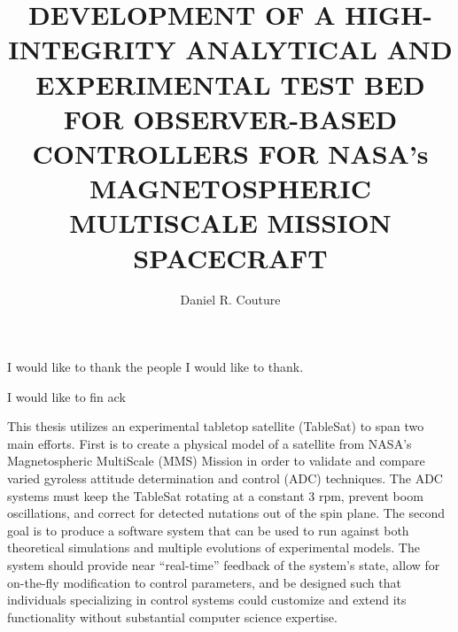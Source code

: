 \documentclass[11pt,doublespace]{unhthesis}
\begin{document}
\title{DEVELOPMENT OF A HIGH-INTEGRITY ANALYTICAL AND EXPERIMENTAL TEST BED FOR OBSERVER-BASED CONTROLLERS FOR NASA's MAGNETOSPHERIC MULTISCALE MISSION SPACECRAFT}
\author{Daniel R. Couture}
\maketitle

\makecopyright

\makeapproval

\begin{dedication}
    I would like to thank the people I would like to thank.
\end{dedication}

\begin{acknowledgments}
    I would like to fin ack
\end{acknowledgments}

\begin{singlespace}
  \tableofcontents
  \listoftables
  \listoffigures
\end{singlespace}

\begin{abstractpage}
This thesis utilizes an experimental tabletop satellite (TableSat) to span two main efforts.  First is to create a physical model of a satellite from NASA's Magnetospheric MultiScale (MMS) Mission in order to validate and compare varied gyroless attitude determination and control (ADC) techniques.  The ADC systems must keep the TableSat rotating at a constant 3 rpm, prevent boom oscillations, and correct for detected nutations out of the spin plane.  The second goal is to produce a software system that can be used to run against both theoretical simulations and multiple evolutions of experimental models.  The system should provide near ``real-time'' feedback of the system's state, allow for on-the-fly modification to control parameters, and be designed such that individuals specializing in control systems could customize and extend its functionality without substantial computer science expertise.
\end{abstractpage}
\end{document}
